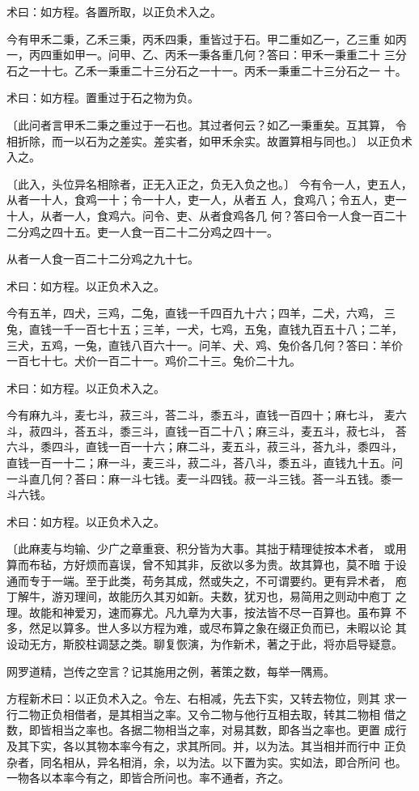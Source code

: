 \documentclass[a4paper,12pt,UTF8,twoside]{ctexbook}
\begin{document}
术曰：如方程。各置所取，以正负术入之。

今有甲禾二秉，乙禾三秉，丙禾四秉，重皆过于石。甲二重如乙一，乙三重 如丙一，丙四重如甲一。问甲、乙、丙禾一秉各重几何？答曰：甲禾一秉重二十 三分石之一十七。乙禾一秉重二十三分石之一十一。丙禾一秉重二十三分石之一 十。

术曰：如方程。置重过于石之物为负。

〔此问者言甲禾二秉之重过于一石也。其过者何云？如乙一秉重矣。互其算， 令相折除，而一以石为之差实。差实者，如甲禾余实。故置算相与同也。〕 以正负术入之。

〔此入，头位异名相除者，正无入正之，负无入负之也。〕 今有令一人，吏五人，从者一十人，食鸡一十；令一十人，吏一人，从者五 人，食鸡八；令五人，吏一十人，从者一人，食鸡六。问令、吏、从者食鸡各几 何？答曰令一人食一百二十二分鸡之四十五。吏一人食一百二十二分鸡之四十一。

从者一人食一百二十二分鸡之九十七。

术曰：如方程。以正负术入之。

今有五羊，四犬，三鸡，二兔，直钱一千四百九十六；四羊，二犬，六鸡， 三兔，直钱一千一百七十五；三羊，一犬，七鸡，五兔，直钱九百五十八；二羊， 三犬，五鸡，一兔，直钱八百六十一。问羊、犬、鸡、兔价各几何？答曰：羊价 一百七十七。犬价一百二十一。鸡价二十三。兔价二十九。

术曰：如方程。以正负术入之。

今有麻九斗，麦七斗，菽三斗，荅二斗，黍五斗，直钱一百四十；麻七斗， 麦六斗，菽四斗，荅五斗，黍三斗，直钱一百二十八；麻三斗，麦五斗，菽七斗， 荅六斗，黍四斗，直钱一百一十六；麻二斗，麦五斗，菽三斗，荅九斗，黍四斗， 直钱一百一十二；麻一斗，麦三斗，菽二斗，荅八斗，黍五斗，直钱九十五。问 一斗直几何？荅曰：麻一斗七钱。麦一斗四钱。菽一斗三钱。荅一斗五钱。黍一 斗六钱。

术曰：如方程。以正负术入之。

〔此麻麦与均输、少广之章重衰、积分皆为大事。其拙于精理徒按本术者， 或用算而布毡，方好烦而喜误，曾不知其非，反欲以多为贵。故其算也，莫不暗 于设通而专于一端。至于此类，苟务其成，然或失之，不可谓要约。更有异术者， 庖丁解牛，游刃理间，故能历久其刃如新。夫数，犹刃也，易简用之则动中庖丁 之理。故能和神爱刃，速而寡尤。凡九章为大事，按法皆不尽一百算也。虽布算 不多，然足以算多。世人多以方程为难，或尽布算之象在缀正负而已，未暇以论 其设动无方，斯胶柱调瑟之类。聊复恢演，为作新术，著之于此，将亦启导疑意。

网罗道精，岂传之空言？记其施用之例，著策之数，每举一隅焉。

方程新术曰：以正负术入之。令左、右相减，先去下实，又转去物位，则其 求一行二物正负相借者，是其相当之率。又令二物与他行互相去取，转其二物相 借之数，即皆相当之率也。各据二物相当之率，对易其数，即各当之率也。更置 成行及其下实，各以其物本率今有之，求其所同。并，以为法。其当相并而行中 正负杂者，同名相从，异名相消，余，以为法。以下置为实。实如法，即合所问 也。一物各以本率今有之，即皆合所问也。率不通者，齐之。
\end{document}
